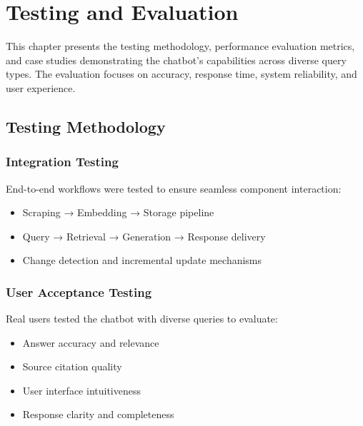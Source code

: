 \chapter{Testing and Evaluation}\label{ch:testing}

This chapter presents the testing methodology, performance evaluation metrics, and case studies demonstrating the chatbot's capabilities across diverse query types. The evaluation focuses on accuracy, response time, system reliability, and user experience.

\section{Testing Methodology}

\subsection{Integration Testing}
End-to-end workflows were tested to ensure seamless component interaction:

\begin{itemize}
    \item Scraping → Embedding → Storage pipeline
    \item Query → Retrieval → Generation → Response delivery
    \item Change detection and incremental update mechanisms
\end{itemize}


\subsection{User Acceptance Testing}
Real users tested the chatbot with diverse queries to evaluate:

\begin{itemize}
    \item Answer accuracy and relevance
    \item Source citation quality
    \item User interface intuitiveness
    \item Response clarity and completeness
\end{itemize}


